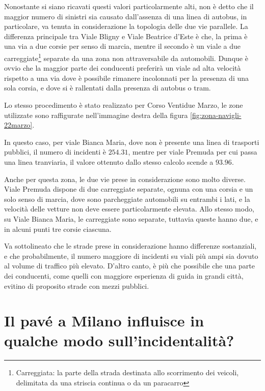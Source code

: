 \documentclass[a4paper,12pt]{report}
\newcommand{\skipline}{\vspace{0.2in}}
\begin{document}
\skipline
Nonostante si siano ricavati questi valori particolarmente alti, 
non è detto che il maggior numero di sinistri sia causato dall'assenza di una 
linea di autobus, 
in particolare, va tenuta in considerazione la topologia delle due vie parallele. 
La differenza principale tra Viale Bligny e Viale Beatrice d'Este è che, 
la prima è una via a due 
corsie per senso di marcia, mentre il secondo è un viale a due 
carreggiate\footnote{Carreggiata: la parte della strada destinata allo scorrimento dei veicoli, 
delimitata da una striscia continua o da un paracarro} 
separate da una zona non attraversabile da automobili. 
Dunque è ovvio che la maggior parte dei conducenti preferirà un viale ad alta velocità 
rispetto a una via dove è possibile rimanere incolonnati per la presenza di una sola 
corsia, e dove si è rallentati dalla presenza di autobus o tram. 

Lo stesso procedimento è stato realizzato per Corso Ventidue Marzo, le zone utilizzate sono 
raffigurate nell'immagine destra della figura \ref{fig:zona-navigli-22marzo}. 

In questo caso, per viale Bianca Maria, dove non è presente una linea di trasporti pubblici, 
il numero di incidenti è $254.31$, mentre per viale Premuda per cui passa una linea tranviaria, 
il valore ottenuto dallo stesso calcolo scende a $93.96$. 

Anche per questa zona, le due vie prese in considerazione sono molto diverse. 
Viale Premuda dispone di due carreggiate separate, ognuna con una corsia e un solo senso 
di marcia, dove sono parcheggiate automobili su entrambi i lati, e la velocità delle 
vetture non deve essere particolarmente elevata. 
Allo stesso modo, su Viale Bianca Maria, le carreggiate sono separate, tuttavia queste 
hanno due, e in alcuni punti tre corsie ciascuna. 

Va sottolineato che le strade prese in considerazione hanno differenze sostanziali, 
e che probabilmente, il numero maggiore di incidenti su viali più ampi sia dovuto al 
volume di traffico più elevato. 
D'altro canto, è più che possibile che una parte dei conducenti, 
come quelli con maggiore esperienza di guida in grandi città, evitino di proposito 
strade con mezzi pubblici.

\section{Il pavé a Milano influisce in qualche modo sull'incidentalità?}
\end{document}

